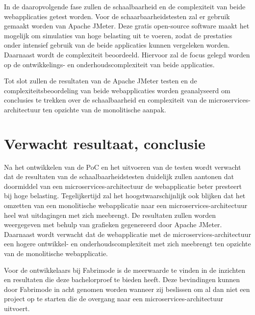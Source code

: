 In de daaropvolgende fase zullen de schaalbaarheid en de complexiteit van beide webapplicaties getest worden. Voor de schaarbaarheidstesten zal er gebruik gemaakt worden van Apache JMeter. Deze gratis open-source software maakt het mogelijk om simulaties van hoge belasting uit te voeren, zodat de prestaties onder intensief gebruik van de beide applicaties kunnen vergeleken worden. Daarnaast wordt de complexiteit beoordeeld. Hiervoor zal de focus gelegd worden op de ontwikkelings- en onderhoudscomplexiteit van beide applicaties.

Tot slot zullen de resultaten van de Apache JMeter testen en de complexiteitsbeoordeling van beide webapplicaties worden geanalyseerd om conclusies te trekken over de schaalbaarheid en complexiteit van de microservices-architectuur ten opzichte van de monolitische aanpak.

\section{Verwacht resultaat, conclusie}%
\label{sec:verwachte_resultaten}

Na het ontwikkelen van de PoC en het uitvoeren van de testen wordt verwacht dat de resultaten van de schaalbaarheidstesten duidelijk zullen aantonen dat doormiddel van een microservices-architectuur de webapplicatie beter presteert bij hoge belasting. Tegelijkertijd zal het hoogstwaarschijnlijk ook blijken dat het omzetten van een monolitische webapplicatie naar een microservices-architectuur heel wat uitdagingen met zich meebrengt. De resultaten zullen worden weergegeven met behulp van grafieken gegenereerd door Apache JMeter. Daarnaast wordt verwacht dat de webapplicatie met de microservices-architectuur een hogere ontwikkel- en onderhoudscomplexiteit met zich meebrengt ten opzichte van de monolitische webapplicatie.

Voor de ontwikkelaars bij Fabrimode is de meerwaarde te vinden in de inzichten en resultaten die deze bachelorproef te bieden heeft. Deze bevindingen kunnen door Fabrimode in acht genomen worden wanneer zij beslissen om al dan niet een project op te starten die de overgang naar een microservices-architectuur uitvoert.

